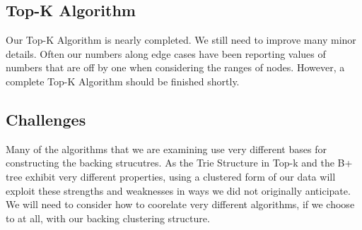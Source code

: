 \documentclass[pdftex,12pt,letter]{article}
\begin{document}
\subsection{Top-K Algorithm}
Our Top-K Algorithm is nearly completed. We still need to improve many minor details. Often our numbers along edge cases have been reporting values of numbers that are off by one when considering the ranges of nodes. However, a complete Top-K Algorithm should be finished shortly.

\subsection{Challenges}
Many of the algorithms that we are examining use very different bases for constructing the backing strucutres. As the Trie Structure in Top-k and the B+ tree exhibit very different properties, using a clustered form of our data will exploit these strengths and weaknesses in ways we did not originally anticipate. We will need to consider how to coorelate very different algorithms, if we choose to at all, with our backing clustering structure. 
\end{document}
